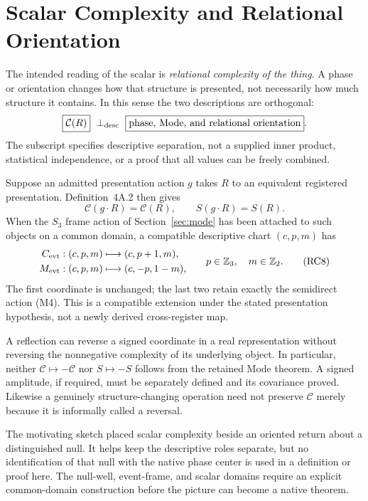 \begingroup
\renewcommand{\thesection}{13C}
\section{Scalar Complexity and Relational Orientation}\label{sec:scalarmode}
The intended reading of the scalar is \emph{relational complexity of the thing}. A phase or orientation changes how that structure is presented, not necessarily how much structure it contains. In this sense the two descriptions are orthogonal:
\[
\boxed{\mathcal C(R)}\ \perp_{\rm desc}\
\boxed{\text{phase, Mode, and relational orientation}}.
\]
The subscript specifies descriptive separation, not a supplied inner product, statistical independence, or a proof that all values can be freely combined.

Suppose an admitted presentation action $g$ takes $R$ to an equivalent registered presentation. Definition~4A.2 then gives
\begin{equation}
\mathcal C(g\cdot R)=\mathcal C(R),\qquad S(g\cdot R)=S(R).
\tag{RC7}\label{eq:scalarinvariance}
\end{equation}
When the $S_3$ frame action of Section~\ref{sec:mode} has been attached to such objects on a common domain, a compatible descriptive chart $(c,p,m)$ has
\begin{equation}
\begin{aligned}
C_{\mathrm{evt}}:(c,p,m)&\longmapsto(c,p+1,m),\\
M_{\mathrm{evt}}:(c,p,m)&\longmapsto(c,-p,1-m),
\end{aligned}
\qquad p\in\mathbb Z_3,\quad m\in\mathbb Z_2.
\tag{RC8}\label{eq:complexitymodechart}
\end{equation}
The first coordinate is unchanged; the last two retain exactly the semidirect action (M4). This is a compatible extension under the stated presentation hypothesis, not a newly derived cross-register map.

A reflection can reverse a signed coordinate in a real representation without reversing the nonnegative complexity of its underlying object. In particular, neither $\mathcal C\mapsto-\mathcal C$ nor $S\mapsto-S$ follows from the retained Mode theorem. A signed amplitude, if required, must be separately defined and its covariance proved. Likewise a genuinely structure-changing operation need not preserve $\mathcal C$ merely because it is informally called a reversal.

The motivating sketch placed scalar complexity beside an oriented return about a distinguished null. It helps keep the descriptive roles separate, but no identification of that null with the native phase center is used in a definition or proof here. The null-well, event-frame, and scalar domains require an explicit common-domain construction before the picture can become a native theorem.

